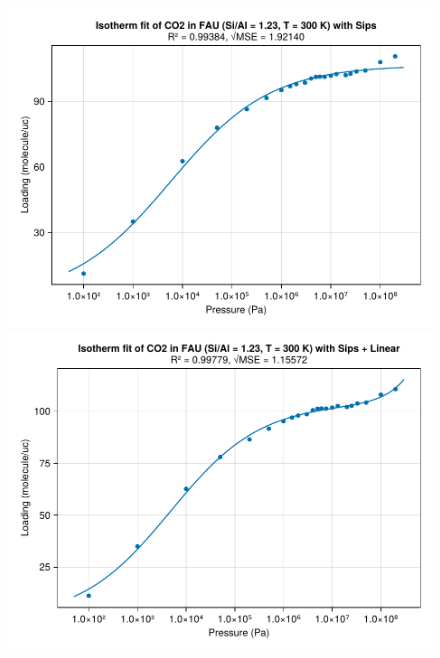 \documentclass[main.tex]{subfiles}
\begin{document}
\begin{figure}
	\begin{minipage}{0.49\columnwidth}
		\includegraphics[width=\columnwidth]{figures/isotherms/Sips.pdf}
	\end{minipage}\hfill%
	\begin{minipage}{0.49\columnwidth}
		\includegraphics[width=\columnwidth]{figures/isotherms/Sips + Linear.pdf}
	\end{minipage}


\end{figure}
\end{document}
